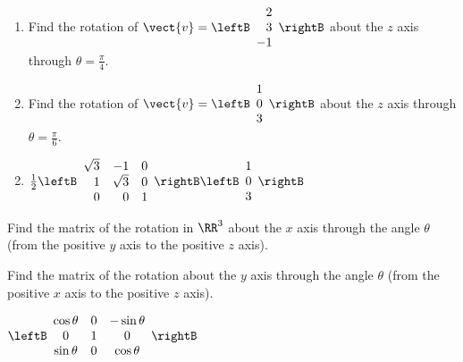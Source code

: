 \begin{multicols}{2}
\begin{ex}
\begin{enumerate}[label={\alph*.}]
\item Find the rotation of 
$\vect{v} = \leftB
\begin{array}{r}
2\\
3\\
-1 
\end{array}
\rightB$
 about the $z$ axis through $\theta = \frac{\pi}{4}$.

\item Find the rotation of 
$\vect{v} = \leftB
\begin{array}{r}
1\\
0\\
3 
\end{array}
\rightB$
 about the $z$ axis through $\theta = \frac{\pi}{6}$.

\end{enumerate}
\begin{sol}
\begin{enumerate}[label={\alph*.}]
\setcounter{enumi}{1}
\item  
$\frac{1}{2}\leftB
\begin{array}{rrr}
\sqrt{3} & -1 & 0\\
1 & \sqrt{3} & 0\\
0 & 0 & 1
\end{array}
\rightB
\leftB
\begin{array}{r}
1\\
0\\
3
\end{array}
\rightB$

\end{enumerate}
\end{sol}
\end{ex}

\begin{ex}
Find the matrix of the rotation in $\RR^3$ about the $x$ axis through the angle $\theta$ (from the positive $y$ axis to the positive $z$ axis).
\end{ex}

\begin{ex}
Find the matrix of the rotation about the $y$ axis through the angle $\theta$ (from the positive $x$ axis to the positive $z$ axis).

\begin{sol}
$\leftB
\begin{array}{ccc}
\cos\theta & 0 & -\sin\theta\\
0 & 1 & 0\\
\sin\theta & 0 & \cos\theta
\end{array}
\rightB$
\end{sol}
\end{ex}


\end{multicols}
